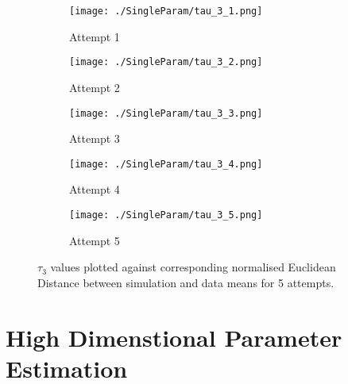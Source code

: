\begin{figure}
    \begin{subfigure}{.5\textwidth}
      \centering
      \texttt{[image: ./SingleParam/tau\_3\_1.png]}
      \caption{Attempt 1}
      \label{singletau:1}
    \end{subfigure}
    \begin{subfigure}{.5\textwidth}
      \centering
      \texttt{[image: ./SingleParam/tau\_3\_2.png]}
      \caption{Attempt 2}
      \label{singletau:2}
    \end{subfigure}
    \begin{subfigure}{.5\textwidth}
        \centering
        \texttt{[image: ./SingleParam/tau\_3\_3.png]}
        \caption{Attempt 3}
        \label{singletau:3}
    \end{subfigure}
    \begin{subfigure}{.5\textwidth} 
        \centering
        \texttt{[image: ./SingleParam/tau\_3\_4.png]}
        \caption{Attempt 4}
        \label{singletau:4}
    \end{subfigure}
    \begin{subfigure}{.5\textwidth}
        \centering
        \texttt{[image: ./SingleParam/tau\_3\_5.png]}
        \caption{Attempt 5}
        \label{singletau:5}
    \end{subfigure}

    \caption{$\tau_3$ values plotted against corresponding normalised Euclidean Distance between simulation and data means for 5 attempts.}
    \label{singletau}
\end{figure}

\section{High Dimenstional Parameter Estimation}